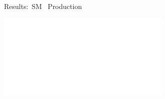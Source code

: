 \documentclass[11pt, xcolor={dvipsnames}, aspectratio=169, notes]{beamer}
\begin{document}
\begin{frame}[standout]
  Results:~SM~\allbold{\HH} Production

  \vspace*{1.5em}

  \includegraphics[scale=1.0]{feynman_graphs/di_higgs_box_inverted}%
  \hspace*{2em}%
\end{frame}



\end{document}

